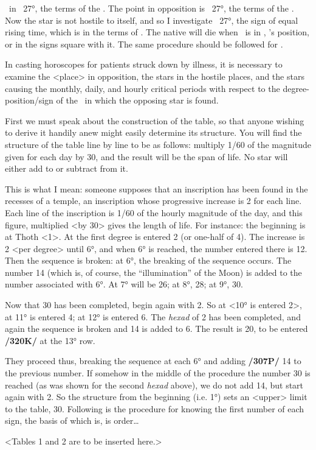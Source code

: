 \Venus\, in \Scorpio\, 27°, the terms of the \Sun. The point in opposition is \Taurus\, 27°, the terms of the \Sun. Now the star is not hostile to itself, and so I investigate \Scorpio\, 27°, the sign of equal rising time, which is in the terms of \Mercury. The native will die when \Venus\, is in \Virgo, \Mercury’s position, or in the signs square with it. The same procedure should be followed for \Mercury.

In casting horoscopes for patients struck down by illness, it is necessary to examine the <place> in opposition, the stars in the hostile places, and the stars causing the monthly, daily, and hourly critical periods with respect to the degree-position/sign of the \Moon\, in which the opposing star is found.

First we must speak about the construction of the table, so that anyone wishing to derive it handily anew might easily determine its structure. You will find the structure of the table line by line to be as follows: multiply 1/60 of the magnitude given for each day by 30, and the result will be the span of life. No star will either add to or subtract from it.

This is what I mean: someone supposes that an inscription has been found in the recesses of a temple, an inscription whose progressive increase is 2 for each line. Each line of the inscription is 1/60 of the hourly magnitude of the day, and this figure, multiplied <by 30>
gives the length of life. For instance: the beginning is at Thoth <1>. At the first degree is entered 2 (or one-half of 4). The increase is 2 <per degree> until 6°, and when 6° is reached, the number entered there is
12. Then the sequence is broken: at 6°, the breaking of the sequence occurs. The number 14 (which is, of course, the “illumination” of the Moon) is added to the number associated with 6°. At 7° will be 26; at
8°, 28; at 9°, 30. 

Now that 30 has been completed, begin again with 2. So at <10° is entered 2>, at 11° is entered 4; at 12° is entered 6. The \textit{hexad} of 2 has been completed, and again the sequence is broken and 14 is added to 6. The result is 20, to be entered \textbf{/320K/} at the 13° row.

They proceed thus, breaking the sequence at each 6° and adding \textbf{/307P/} 14 to the previous number. If somehow in the middle of the procedure the number 30 is reached (as was shown for the second \textit{hexad} above), we do not add 14, but start again with 2. So the structure from the beginning (i.e. 1°) sets an <upper> limit to the table, 30. Following is the procedure for knowing the first number of each sign, the basis of which is, is order…

<Tables 1 and 2 are to be inserted here.>

\newpage